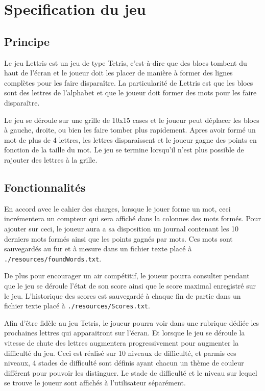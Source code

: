\documentclass[11pt, openright]{book}
\begin{document}



    
    \newpage

    
     \section{Specification du jeu}

        \subsection{Principe}

            Le jeu Lettris est un jeu de type Tetris, c'est-à-dire que des blocs tombent du haut de l'écran et le joueur doit les placer de manière à former des lignes complètes pour les faire disparaître. La particularité de Lettris est que les blocs sont des lettres de l'alphabet et que le joueur doit former des mots pour les faire disparaître.

            Le jeu se déroule sur une grille de 10x15 cases et le joueur peut déplacer les blocs à gauche, droite, ou bien les faire tomber plus rapidement. Apres avoir formé un mot de plus de 4 lettres, les lettres disparaissent et le joueur gagne des points en fonction de la taille du mot. Le jeu se termine lorsqu'il n'est plus possible de rajouter des lettres à la grille. 
            
         \subsection{Fonctionnalités}
            En accord avec le cahier des charges, lorsque le jouer forme un mot, ceci incrémentera un compteur qui sera affiché dans la colonnes des mots formés. Pour ajouter sur ceci, le joueur aura a sa disposition un journal contenant les 10 derniers mots formés ainsi que les points gagnés par mots. Ces mots sont sauvegardés au fur et à mesure dans un fichier texte placé à  \texttt{./resources/foundWords.txt}. 

            De plus pour encourager un air compétitif, le joueur pourra consulter pendant que le jeu se déroule l'état de son score ainsi que le score maximal enregistré sur le jeu. L'historique des scores est sauvegardé à chaque fin de partie dans un fichier texte placé à \texttt{./resources/Scores.txt}.

            Afin d'être fidèle au jeu Tetris, le joueur pourra voir dans une rubrique dédiée les prochaines lettres qui apparaitront sur l'écran. Et lorsque le jeu se déroule la vitesse de chute des lettres augmentera progressivement pour augmenter la difficulté du jeu. Ceci est réalisé sur 10 niveaux de difficulté, et parmis ces niveaux, 4 stades de difficulté sont définis ayant chacun un thème de couleur différent pour pouvoir les distinguer. Le stade de difficulté et le niveau sur lequel se trouve le joueur sont affichés à l'utilisateur séparément.
\end{document}
